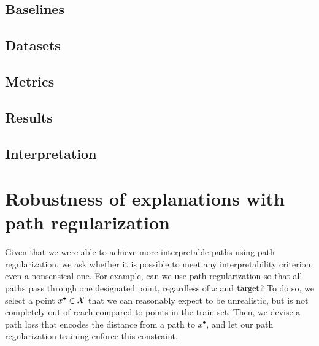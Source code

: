 \documentclass[../main.tex]{subfiles}
\begin{document}


\subsection{Baselines}

\subsection{Datasets}

\subsection{Metrics}

\subsection{Results}

\subsection{Interpretation}

\section{Robustness of explanations with path regularization}

\newcommand{\xgoal}{x^\bullet}

Given that we were able to achieve more interpretable paths using path regularization, we ask whether it is possible to meet any interpretability criterion, even a nonsensical one.
For example, can we use path regularization so that all paths pass through one designated point, regardless of $x$ and $\mathrm{target}$?
To do so, we select a point $\xgoal \in \inputspace$ that we can reasonably expect to be unrealistic, but is not completely out of reach compared to points in the train set.
Then, we devise a path loss that encodes the distance from a path to $x^\bullet$, and let our path regularization training enforce this constraint.
\end{document}
